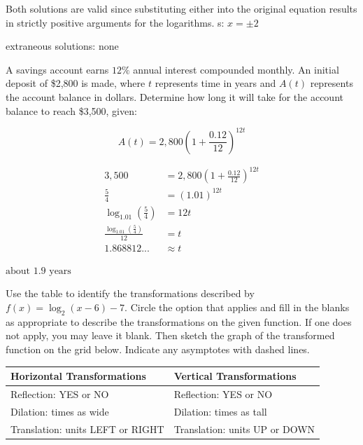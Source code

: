 \documentclass[addpoints]{exam}
\begin{document}
\begin{questions}
\begin{solution}
 Both solutions are valid since substituting either into the original equation results in strictly positive arguments for the logarithms. 
s: \(\boxed{ x = \pm 2 }\)

extraneous solutions: \(\boxed{ \text{none} }\)
\end{solution}
\newpage


\question[6]  A savings account earns \(12\%\) annual interest compounded monthly. An initial deposit of \$2,800 is made, where \(t\) represents time in years and \(A(t)\) represents the account balance in dollars. Determine how long it will take for the account balance to reach \$3,500, given:

\[A(t) = 2,800 \left( 1 + \frac{0.12}{12} \right)^{12t}\]
\begin{solution}
\[\begin{aligned} 3,500 &= 2,800 \left( 1 + \frac{0.12}{12} \right)^{12t} \\ \frac{5}{4} &= (1.01)^{12t} \\ \log_{1.01}\left(\frac{5}{4}\right) &= 12t \\ \frac{\log_{1.01}\left(\frac{5}{4}\right)}{12} &= t \\ 1.868812... &\approx t \end{aligned}\]

\(\boxed{\text{about } 1.9 \text{ years}}\)
\end{solution}
\answerline
\newpage


\question[5]  Use the table to identify the transformations described by $f(x)=\log_{2}(x - 6) - 7$. Circle the option that applies and fill in the blanks as appropriate to describe the transformations on the given function. If one does not apply, you may leave it blank. Then sketch the graph of the transformed function on the grid below. Indicate any asymptotes with dashed lines.\\
\begin{table}[h]
    \renewcommand{\arraystretch}{3} 
    \centering
    \begin{tabular}{|l|l|}
        \hline
        \textbf{Horizontal Transformations}               & \textbf{Vertical Transformations}              \\ \hline
        Reflection: YES    or     NO       & Reflection:       YES    or     NO    \\ \hline
        Dilation: \underline{\hspace{2cm}} times as wide           & Dilation: \underline{\hspace{2cm}} times as tall        \\ \hline
        Translation: \underline{\hspace{2cm}} units LEFT or RIGHT & Translation: \underline{\hspace{2cm}} units UP or DOWN \\ \hline
    \end{tabular}
\end{table}


\end{questions}
\end{document}
